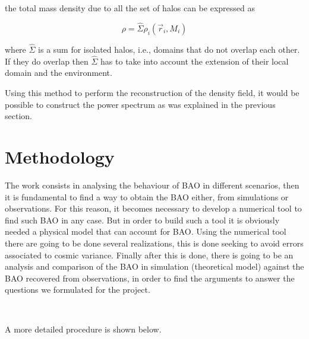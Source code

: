 \documentclass[a4,useAMS,usegraphicx,12pt]{article}
\begin{document}
the total mass density due to all the set of halos can be expressed as 

\[
\rho = \hat{\Sigma} \rho_i(\vec{r}_i,M_i)
\]

where $\hat{\Sigma}$ is a sum for isolated halos, i.e., domains that do not overlap each other. If they do overlap
then $\hat{\Sigma}$ has to take into account the extension of their local domain and the environment. 

Using this method to perform the reconstruction of the density field,  it would be possible to construct the power spectrum
as was explained in the previous section. 


\section{Methodology}

The work consists in analysing the behaviour of BAO in different scenarios, then it is fundamental
to find a way to obtain the BAO either, from simulations or observations. For this reason, 
it becomes necessary to develop a numerical tool to find such BAO in any case. But in order to 
build such a tool it is obviously needed a physical model that can account for BAO. 
Using the numerical tool there are going to be done several realizations, this is done seeking to avoid errors
associated to cosmic variance. Finally after this is done, there is going to be an 
analysis and comparison of the BAO in simulation (theoretical model) against the BAO recovered from observations,
in order to find the arguments to answer the questions we formulated for the project.

\

A more detailed procedure is shown below.
\end{document}
